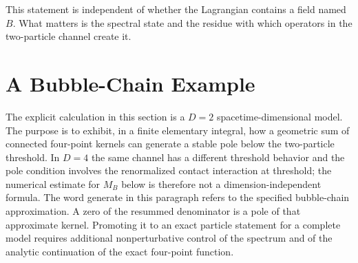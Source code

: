 \begin{center}
\end{center}

This statement is independent of whether the Lagrangian contains a field
named \(B\). What matters is the spectral state and the residue with which
operators in the two-particle channel create it.

\section{A Bubble-Chain Example}

The explicit calculation in this section is a \(D=2\) spacetime-dimensional
model.  The purpose is to exhibit, in a finite elementary integral, how a
geometric sum of connected four-point kernels can generate a stable pole below
the two-particle threshold.  In \(D=4\) the same channel has a different
threshold behavior and the pole condition involves the renormalized contact
interaction at threshold; the numerical estimate for \(M_B\) below is therefore
not a dimension-independent formula.
The word generate in this paragraph refers to the specified bubble-chain
approximation.  A zero of the resummed denominator is a pole of that
approximate kernel.  Promoting it to an exact particle statement for a complete
model requires additional nonperturbative control of the spectrum and of the
analytic continuation of the exact four-point function.


